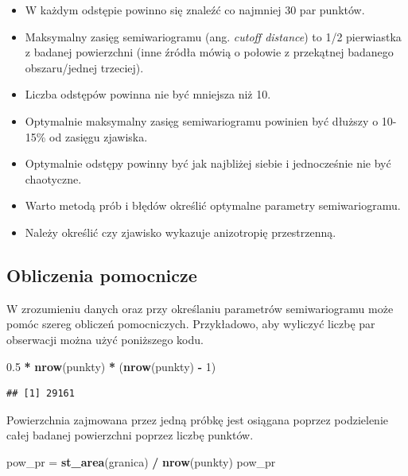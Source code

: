 \documentclass[
  paper=6in:9in,pagesize=pdftex,headinclude=on,footinclude=on,10pt]{scrbook}
\newenvironment{Shaded}{\begin{snugshade}}{\end{snugshade}}
\newcommand{\DecValTok}[1]{\textcolor[rgb]{0.00,0.00,0.81}{#1}}
\newcommand{\FloatTok}[1]{\textcolor[rgb]{0.00,0.00,0.81}{#1}}
\newcommand{\FunctionTok}[1]{\textcolor[rgb]{0.13,0.29,0.53}{\textbf{#1}}}
\newcommand{\NormalTok}[1]{#1}
\newcommand{\OtherTok}[1]{\textcolor[rgb]{0.56,0.35,0.01}{#1}}
\newcommand{\SpecialCharTok}[1]{\textcolor[rgb]{0.81,0.36,0.00}{\textbf{#1}}}
\providecommand{\tightlist}{%
  \setlength{\itemsep}{0pt}\setlength{\parskip}{0pt}}
\begin{document}
\begin{itemize}
\tightlist
\item
  W każdym odstępie powinno się znaleźć co najmniej 30 par punktów.
\item
  Maksymalny zasięg semiwariogramu (ang. \emph{cutoff distance}) to 1/2 pierwiastka z badanej powierzchni (inne źródła mówią o połowie z przekątnej badanego obszaru/jednej trzeciej).
\item
  Liczba odstępów powinna nie być mniejsza niż 10.
\item
  Optymalnie maksymalny zasięg semiwariogramu powinien być dłuższy o 10-15\% od zasięgu zjawiska.
\item
  Optymalnie odstępy powinny być jak najbliżej siebie i jednocześnie nie być chaotyczne.
\item
  Warto metodą prób i błędów określić optymalne parametry semiwariogramu.
\item
  Należy określić czy zjawisko wykazuje anizotropię przestrzenną.
\end{itemize}

\subsection{Obliczenia pomocnicze}\label{obliczenia-pomocnicze}

W zrozumieniu danych oraz przy określaniu parametrów semiwariogramu może pomóc szereg obliczeń pomocniczych.
Przykładowo, aby wyliczyć liczbę par obserwacji można użyć poniższego kodu.

\begin{Shaded}
\begin{Highlighting}[]
\FloatTok{0.5} \SpecialCharTok{*} \FunctionTok{nrow}\NormalTok{(punkty) }\SpecialCharTok{*}\NormalTok{ (}\FunctionTok{nrow}\NormalTok{(punkty) }\SpecialCharTok{{-}} \DecValTok{1}\NormalTok{)}
\end{Highlighting}
\end{Shaded}

\begin{verbatim}
## [1] 29161
\end{verbatim}

Powierzchnia zajmowana przez jedną próbkę jest osiągana poprzez podzielenie całej badanej powierzchni poprzez liczbę punktów.

\begin{Shaded}
\begin{Highlighting}[]
\NormalTok{pow\_pr }\OtherTok{=} \FunctionTok{st\_area}\NormalTok{(granica) }\SpecialCharTok{/} \FunctionTok{nrow}\NormalTok{(punkty)}
\NormalTok{pow\_pr}
\end{Highlighting}
\end{Shaded}
\end{document}
